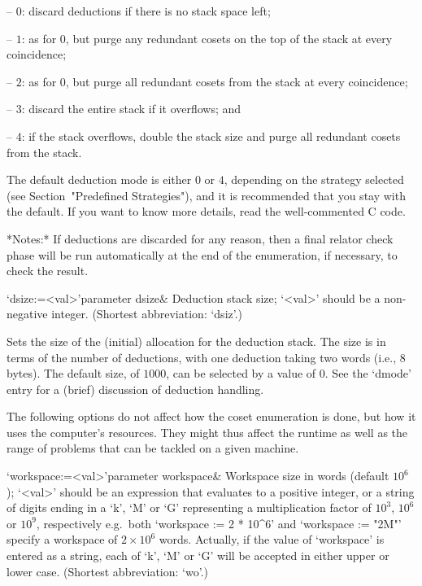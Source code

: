 \beginlist

\item{--} $0$:  
discard deductions if there is no stack space left;

\item{--} $1$: 
as for $0$, but purge any redundant cosets on the top of the stack
at every coincidence;

\item{--} $2$: 
as for 0, but  purge all redundant cosets from the stack at
every coincidence;

\item{--} $3$:
discard the entire stack if it overflows; and

\item{--} $4$:
if  the stack  overflows,  double the  stack size  and  purge all
redundant cosets from the stack.

\endlist

The  default deduction mode  is either  $0$ or  $4$, depending  on the
strategy  selected (see  Section~"Predefined Strategies"),  and  it is
recommended that you stay with the  default.  If you want to know more
details, read the well-commented C code.

*Notes:*
If deductions are discarded for any reason, then a final relator check
phase  will be run  automatically at  the end  of the  enumeration, if
necessary, to check the result.

\>`dsize:=<val>'{parameter dsize}&
Deduction stack size; `<val>' should be a non-negative integer.
(Shortest abbreviation: `dsiz'.)

Sets the  size of  the (initial) allocation  for the  deduction stack.
The size is  in terms of the number of  deductions, with one deduction
taking two words (i.e., 8 bytes).  The default size, of $1000$, can be
selected  by  a value  of  0.   See the  `dmode' entry  for a  (brief)
discussion of deduction handling.

\enditems


The following options do not affect how the coset enumeration is done,
but how it  uses the computer's resources. They  might thus affect the
runtime as  well as  the range of  problems that  can be tackled  on a
given machine.

\beginitems

\>`workspace:=<val>'{parameter workspace}&
Workspace size in words (default $10^6$);
`<val>' should be an expression that evaluates to a positive integer,
or a string of digits ending in a `k', `M' or `G' representing a
multiplication factor of $10^3$, $10^6$ or $10^9$, respectively
e.g.~both `workspace := 2 * 10^6' and `workspace := "2M"' specify
a workspace of $2\times10^6$ words. Actually, if the value of
`workspace' is entered as a string, each of `k', `M' or `G'
will be accepted in either upper or lower case.
(Shortest abbreviation: `wo'.)

